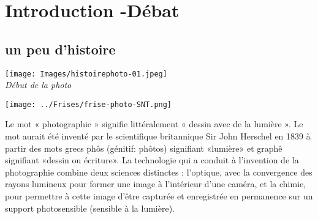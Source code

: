 \documentclass[10pt,fleqn]{article} %
\begin{document}


\section{Introduction -Débat}

\subsection{un peu d'histoire}
\begin{multicols}{2}
\begin{flushleft}

	\texttt{[image: Images/histoirephoto-01.jpeg]}
	\\
	\textit{Début de la photo}

	\texttt{[image: ../Frises/frise-photo-SNT.png]}
\end{flushleft}


\end{multicols}

Le mot « photographie » signifie littéralement « dessin avec de la lumière ». Le mot aurait été inventé par le scientifique britannique Sir John Herschel en 1839 à partir des mots grecs phôs (génitif: phôtos) signifiant «lumière» et graphê signifiant «dessin ou écriture». La technologie qui a conduit à l’invention de la photographie combine deux sciences distinctes : l’optique, avec la convergence des rayons lumineux pour former une image à l’intérieur d’une caméra, et la chimie, pour permettre à cette image d’être capturée et enregistrée en permanence sur un support photosensible (sensible à la lumière).
\end{document}
